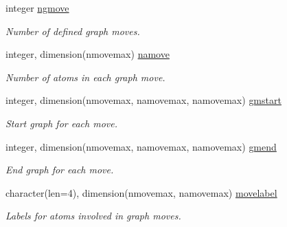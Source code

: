 \begin{DoxyCompactItemize}
\mbox{\label{namespaceglobaldata_afde091eb986cf9469fefc5e711cadde5}} 
integer \mbox{\hyperlink{namespaceglobaldata_afde091eb986cf9469fefc5e711cadde5}{ngmove}}
\begin{DoxyCompactList}\small\item\em Number of defined graph moves. \end{DoxyCompactList}\item 
\mbox{\label{namespaceglobaldata_a9a7c36016779745bb29236fb9d2a4c35}} 
integer, dimension(nmovemax) \mbox{\hyperlink{namespaceglobaldata_a9a7c36016779745bb29236fb9d2a4c35}{namove}}
\begin{DoxyCompactList}\small\item\em Number of atoms in each graph move. \end{DoxyCompactList}\item 
\mbox{\label{namespaceglobaldata_a1848c3f97f05a1e9105d784bca072679}} 
integer, dimension(nmovemax, namovemax, namovemax) \mbox{\hyperlink{namespaceglobaldata_a1848c3f97f05a1e9105d784bca072679}{gmstart}}
\begin{DoxyCompactList}\small\item\em Start graph for each move. \end{DoxyCompactList}\item 
\mbox{\label{namespaceglobaldata_aeaa03f16c215c1477c9e7bf1a526480b}} 
integer, dimension(nmovemax, namovemax, namovemax) \mbox{\hyperlink{namespaceglobaldata_aeaa03f16c215c1477c9e7bf1a526480b}{gmend}}
\begin{DoxyCompactList}\small\item\em End graph for each move. \end{DoxyCompactList}\item 
\mbox{\label{namespaceglobaldata_abe5c391ec7eaa8f2e3b69e736f848058}} 
character(len=4), dimension(nmovemax, namovemax) \mbox{\hyperlink{namespaceglobaldata_abe5c391ec7eaa8f2e3b69e736f848058}{movelabel}}
\begin{DoxyCompactList}\small\item\em Labels for atoms involved in graph moves. \end{DoxyCompactList}\item 
\mbox{\label{namespaceglobaldata_a9ee2df5138a5c5d4c613d2bde5bd7128}} 

\end{DoxyCompactItemize}
